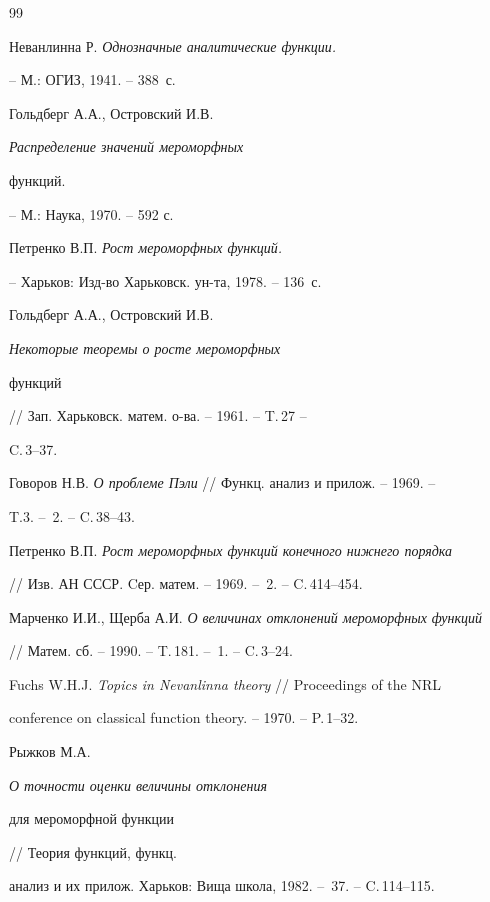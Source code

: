 \begin{thebibliography}{99}







Неванлинна Р. {\it Однозначные аналитические функции.}


-- М.: ОГИЗ, 1941. -- 388~с.




Гольдберг А.А., Островский И.В. {\it Распределение значений мероморфных


функций.} -- М.: Наука, 1970. -- 592 с.




Петренко В.П. {\it Рост мероморфных функций.}


-- Харьков: Изд-во Харьковск. ун-та, 1978. -- 136~с.




Гольдберг А.А., Островский И.В. {\it Некоторые теоремы о росте мероморфных


функций} // Зап. Харьковск. матем. о-ва. -- 1961. -- T.\,27 --


C.\,3--37.




Говоров Н.В. {\it О проблеме Пэли} // Функц. анализ и прилож. -- 1969. --


T.3. -- \No\,2. -- C.\,38--43.




Петренко В.П. {\it Рост мероморфных функций конечного нижнего порядка}


// Изв. АН СССР. Cер. матем. -- 1969. -- \No\,2. -- C.\,414--454.




Марченко И.И., Щерба А.И. {\it О величинах отклонений мероморфных функций}


// Матем. сб. -- 1990. -- T.\,181. -- \No\,1. -- C.\,3--24.




Fuchs W.H.J. {\it Topics in Nevanlinna theory } // Proceedings of the NRL


conference on classical function theory. -- 1970. -- P.\,1--32.




Рыжков М.А. {\it О точности оценки величины отклонения


для мероморфной функции} // Теория функций, функц.


анализ и их прилож. Харьков: Вища школа, 1982. -- \No\,37. -- C.\,114--115.



\end{thebibliography}
